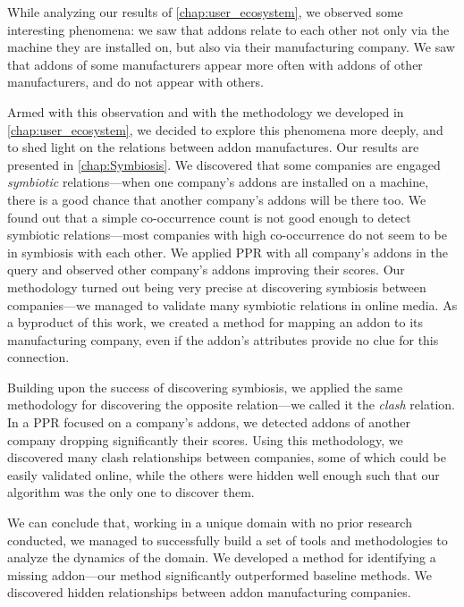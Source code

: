 \documentclass[11pt,oneside]{book}
\begin{document}
While analyzing our results of \autoref{chap:user_ecosystem}, we observed some interesting phenomena: we saw that addons relate to each other not only via the machine they are installed on, but also via their manufacturing company. We saw that addons of some manufacturers appear more often with addons of other manufacturers, and do not appear with others.

Armed with this observation and with the methodology we developed in \autoref{chap:user_ecosystem}, we decided to explore this phenomena more deeply, and to shed light on the relations between addon manufactures. Our results are presented in \autoref{chap:Symbiosis}.
We discovered that some companies are engaged \emph{symbiotic} relations---when one company's addons are installed on a machine, there is a good chance that another company's addons will be there too. We found out that a simple co-occurrence count is not good enough to detect symbiotic relations---most companies with high co-occurrence do not seem to be in symbiosis with each other. We applied PPR with all company's addons in the query and observed other company's addons improving their scores. Our methodology turned out being very precise at discovering symbiosis between companies---we managed to validate many symbiotic relations in online media. As a byproduct of this work, we created a method for mapping an addon to its manufacturing company, even if the addon's attributes provide no clue for this connection.

Building upon the success of discovering symbiosis, we applied the same methodology for discovering the opposite relation---we called it the \emph{clash} relation. In a PPR focused on a company's addons, we detected addons of another company dropping significantly their scores. Using this methodology, we discovered many clash relationships between companies, some of which could be easily validated online, while the others were hidden well enough such that our algorithm was the only one to discover them.

We can conclude that, working in a unique domain with no prior research conducted, we managed to successfully build a set of tools and methodologies to analyze the dynamics of the domain.
We developed a method for identifying a missing addon---our method significantly outperformed baseline methods.
We discovered hidden relationships between addon manufacturing companies.



%
\iffalse
\newpage
\appendix
\chapter{} 
\renewcommand{\figurename}{Appendix}
\end{document}
